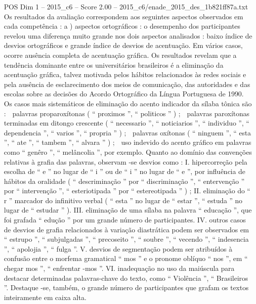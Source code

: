 \begin{textsample}{POS Dim 1 – 2015\_c6 – Score 2.00 – 2015\_c6/enade\_2015\_des\_1b821ff87a.txt}
Os resultados da avaliação correspondem aos seguintes aspectos observados em cada competência : a ) aspectos ortográficos : o desempenho dos participantes revelou uma diferença muito grande nos dois aspectos analisados : baixo índice de desvios ortográficos e grande índice de desvios de acentuação.
Em vários casos, ocorre ausência completa de acentuação gráfica.
Os resultados revelam que a tendência dominante entre os universitários brasileiros é a eliminação da acentuação gráfica, talvez motivada pelos hábitos relacionados às redes sociais e pela ausência de esclarecimento dos meios de comunicação, das autoridades e das escolas sobre as decisões do Acordo Ortográfico da Língua Portuguesa de 1990.
Os casos mais sistemáticos de eliminação do acento indicador da sílaba tônica são :  palavras proparoxítonas ( “ proximos ”, “ politicos ” ) ;  palavras paroxítonas terminadas em ditongo crescente ( “ necessario ”, “ noticiarios ”, “ individuo ”, “ dependencia ”, “ varios ”, “ propria ” ) ;  palavras oxítonas ( “ ninguem ”, “ esta ”, “ ate ”, “ tambem ”, “ alvara ” ) ;  uso indevido do acento gráfico em palavras como “ genêro ”, “ melâncolia ”, por exemplo.
Quanto ao domínio das convenções relativas à grafia das palavras, observam -se desvios como : I. hipercorreção pela escolha de “ e ” no lugar de “ i ” ou de “ i ” no lugar de “ e ”, por influência de hábitos da oralidade ( “ descriminação ” por “ discriminação ”, “ entervenção ” por “ intervenção ”, “ esteriotipada ” por “ estereotipada ” ) ; II. eliminação do “ r ” marcador do infinitivo verbal ( “ esta ” no lugar de “ estar ”, “ estuda ” no lugar de “ estudar ” ).
III. eliminação de uma sílaba na palavra “ educação ”, que foi grafada “ edução ” por um grande número de participantes.
IV. outros casos de desvios de grafia relacionados à variação diastrática podem ser observados em “ estrupo ”, “ subjulgadas ”, “ precoseito ”, “ soubre ”, “ vecendo ”, “ indesencia ”, “ apolojia ”, “ fulga ”.
V. desvios de segmentação podem ser atribuídos à confusão entre o morfema gramatical “ mos ” e o pronome oblíquo “ nos ”, em “ chegar mos ”, “ enfrentar -mos ”.
VI. inadequação no uso da maiúscula para destacar determinadas palavras-chave do texto, como “ Violência ”, “ Brasileiros ”.
Destaque -se, também, o grande número de participantes que grafam os textos inteiramente em caixa alta.

\end{textsample}
